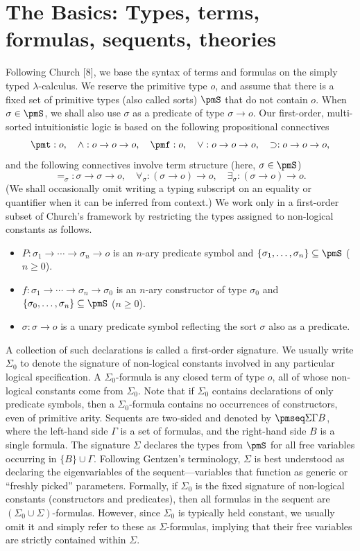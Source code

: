\section*{The Basics: Types, terms, formulas, sequents, theories}
Following Church [8], we base the syntax of terms and formulas on the simply typed $\lambda$-calculus. We reserve the primitive type $o$, and assume that there is a fixed set of primitive types (also called sorts) $\pmS$ that do not contain $o$. When $\sigma\in\pmS$, we shall also use $\sigma$ as a predicate of type $\sigma\to o$.
Our first-order, multi-sorted intuitionistic logic is based on the following propositional connectives
\[\pmt:o,\quad\wedge:o\to o\to o,\quad\pmf:o,\quad\vee:o\to o\to o,\quad\supset:o\to o\to o,\]
and the following connectives involve term structure (here, $\sigma\in\pmS$)
\[=_\sigma:\sigma\to\sigma\to o,\quad\forall_\sigma:(\sigma\to o)\to o,\quad\exists_\sigma:(\sigma\to o)\to o.\]
(We shall occasionally omit writing a typing subscript on an equality or quantifier when it can be inferred from context.) We work only in a first-order subset of Church's framework by restricting the types assigned to non-logical constants as follows.
\begin{itemize}
\item $P:\sigma_1\to\cdots\to\sigma_n\to o$ is an $n$-ary predicate symbol and $\{\sigma_1,\ldots,\sigma_n\}\subseteq\pmS$ ($n\geq0$).
\item $f:\sigma_1\to\cdots\to\sigma_n\to\sigma_0$ is an $n$-ary constructor of type $\sigma_0$ and $\{\sigma_0,\ldots,\sigma_n\}\subseteq\pmS$ ($n\geq0$).
\item $\sigma:\sigma\to o$ is a unary predicate symbol reflecting the sort $\sigma$ also as a predicate.
\end{itemize}
A collection of such declarations is called a first-order signature. We usually write $\Sigma_0$ to denote the signature of non-logical constants involved in any particular logical specification. A $\Sigma_0$-formula is any closed term of type $o$, all of whose non-logical constants come from $\Sigma_0$. Note that if $\Sigma_0$ contains declarations of only predicate symbols, then a $\Sigma_0$-formula contains no occurrences of constructors, even of primitive arity.
Sequents are two-sided and denoted by $\pmseq\Sigma\Gamma B$, where the left-hand side $\Gamma$ is a set of formulas, and the right-hand side $B$ is a single formula. The signature $\Sigma$ declares the types from $\pmS$ for all free variables occurring in $\{B\}\cup\Gamma$. Following Gentzen's terminology, $\Sigma$ is best understood as declaring the eigenvariables of the sequent---variables that function as generic or ``freshly picked'' parameters. Formally, if $\Sigma_0$ is the fixed signature of non-logical constants (constructors and predicates), then all formulas in the sequent are $(\Sigma_0\cup\Sigma)$-formulas. However, since $\Sigma_0$ is typically held constant, we usually omit it and simply refer to these as $\Sigma$-formulas, implying that their free variables are strictly contained within $\Sigma$.
